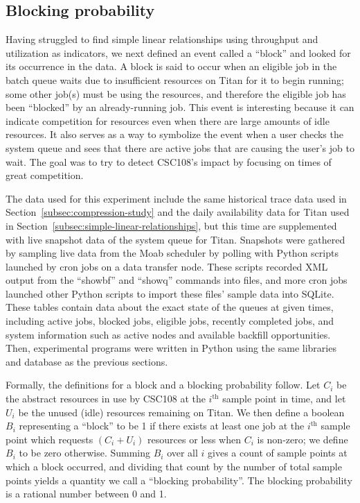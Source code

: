 \subsection{Blocking probability}
\label{subsec:blocking-probability}

Having struggled to find simple linear relationships using throughput and
utilization as indicators, we next defined an event called a ``block'' and
looked for its occurrence in the data. A block is said to occur when an
eligible job in the batch queue waits due to insufficient resources on Titan
for it to begin running; some other job(s) must be using the resources, and
therefore the eligible job has been ``blocked'' by an already-running job. This
event is interesting because it can indicate competition for resources even
when there are large amounts of idle resources. It also serves as a way to
symbolize the event when a user checks the system queue and sees that there are
active jobs that are causing the user's job to wait. The goal was to try to
detect CSC108's impact by focusing on times of great competition.

The data used for this experiment include the same historical trace data used
in Section~\ref{subsec:compression-study} and the daily availability
data for Titan used in Section~\ref{subsec:simple-linear-relationships}, but
this time are supplemented with live snapshot data of the system queue for
Titan. Snapshots were gathered by sampling live data from the Moab scheduler by
polling with Python scripts launched by cron jobs on a data transfer node.
These scripts recorded XML output from the ``showbf'' and ``showq'' commands
into files, and more cron jobs launched other Python scripts to import these
files' sample data into SQLite. These tables contain data about the exact state
of the queues at given times, including active jobs, blocked jobs, eligible
jobs, recently completed jobs, and system information such as active nodes and
available backfill opportunities. Then, experimental programs were written in
Python using the same libraries and database as the previous sections.

Formally, the definitions for a block and a blocking probability follow. Let
$C_i$ be the abstract resources in use by CSC108 at the $i^{\text{th}}$ sample
point in time, and let $U_i$ be the unused (idle) resources remaining on Titan.
We then define a boolean $B_i$ representing a ``block'' to be 1 if there exists
at least one job at the $i^{\text{th}}$ sample point which requests
$(C_i + U_i)$ resources or less when $C_i$ is non-zero; we define $B_i$ to be
zero otherwise. Summing $B_i$ over all $i$ gives a count of sample points at
which a block occurred, and dividing that count by the number of total sample
points yields a quantity we call a ``blocking probability''. The blocking
probability is a rational number between 0 and 1.

